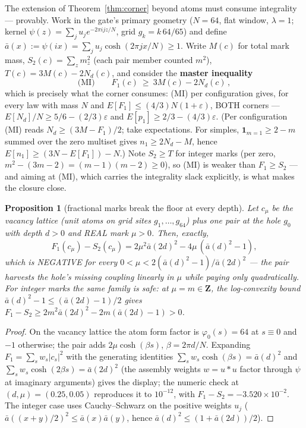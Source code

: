 \documentclass[11pt]{article}
\theoremstyle{plain}
\newtheorem{proposition}[theorem]{Proposition}
\theoremstyle{definition}
\theoremstyle{remark}
\newcommand{\Z}{\mathbf{Z}}
\newcommand{\Nd}{N_{d}}
\newcommand{\one}{\mathbf{1}}
\begin{document}
The extension of Theorem~\ref{thm:corner} beyond atoms must consume integrality
--- provably. Work in the gate's primary geometry ($N = 64$, flat window,
$\lambda = 1$; kernel $\psi(z) = \sum_j u_j e^{-2\pi i j z/N}$, grid
$g_k = k\,64/65$) and define
$\bar{a}(x) := \psi(ix) = \sum_j u_j \cosh(2\pi j x/N) \ge 1$. Write $M(c)$ for
total mark mass, $S_2(c) = \sum_z m_z^2$ (each pair member counted $m^2$),
$T(c) = 3M(c) - 2\Nd(c)$, and consider the \textbf{master inequality}
\[
  \text{(MI)} \qquad F_1(c) \ \ge\ 3M(c) - 2\Nd(c) \,,
\]
which is precisely what the corner consumes: (MI) per configuration gives, for
every law with mass $N$ and $E[F_1] \le (4/3)N(1 + \varepsilon)$, BOTH corners ---
$E[\Nd]/N \ge 5/6 - (2/3)\varepsilon$ and
$E[p_1] \ge 2/3 - (4/3)\varepsilon$. (Per configuration (MI) reads
$\Nd \ge (3M - F_1)/2$; take expectations. For simples,
$\one_{m = 1} \ge 2 - m$ summed over the zero multiset gives
$n_1 \ge 2\Nd - M$, hence $E[n_1] \ge (3N - E[F_1]) - N$.) Note $S_2 \ge T$ for
integer marks (per zero, $m^2 - (3m - 2) = (m-1)(m-2) \ge 0$), so (MI) is weaker
than $F_1 \ge S_2$ --- and aiming at (MI), which carries the integrality slack
explicitly, is what makes the closure close.

\begin{proposition}[fractional marks break the floor at every depth]
\label{prop:fractional}
Let $c_\mu$ be the vacancy lattice (unit atoms on grid sites
$g_1, \ldots, g_{64}$) plus one pair at the hole $g_0$ with depth $d > 0$ and
REAL mark $\mu > 0$. Then, exactly,
\[
  F_1(c_\mu) - S_2(c_\mu)
  = 2\mu^2 \bar{a}(2d)^2 - 4\mu\,(\bar{a}(d)^2 - 1),
\]
which is NEGATIVE for every $0 < \mu < 2(\bar{a}(d)^2 - 1)/\bar{a}(2d)^2$ --- the
pair harvests the hole's missing coupling linearly in $\mu$ while paying only
quadratically. For integer marks the same family is safe: at $\mu = m \in \Z$,
the log-convexity bound $\bar{a}(d)^2 - 1 \le (\bar{a}(2d) - 1)/2$ gives
$F_1 - S_2 \ge 2m^2 \bar{a}(2d)^2 - 2m(\bar{a}(2d) - 1) > 0$.
\end{proposition}

\begin{proof}
On the vacancy lattice the atom form factor is $\varphi_0(s) = 64$ at
$s \equiv 0$ and $-1$ otherwise; the pair adds $2\mu \cosh(\beta s)$,
$\beta = 2\pi d/N$. Expanding $F_1 = \sum_s w_s |c_s|^2$ with the generating
identities $\sum_s w_s \cosh(\beta s) = \bar{a}(d)^2$ and
$\sum_s w_s \cosh(2\beta s) = \bar{a}(2d)^2$ (the assembly weights $w = u * u$
factor through $\psi$ at imaginary arguments) gives the display; the numeric
check at $(d, \mu) = (0.25, 0.05)$ reproduces it to $10^{-12}$, with
$F_1 - S_2 = -3.520 \times 10^{-2}$. The integer case uses Cauchy--Schwarz on the
positive weights $u_j$ ($\bar{a}((x+y)/2)^2 \le \bar{a}(x)\bar{a}(y)$, hence
$\bar{a}(d)^2 \le (1 + \bar{a}(2d))/2$).
\end{proof}
\end{document}
